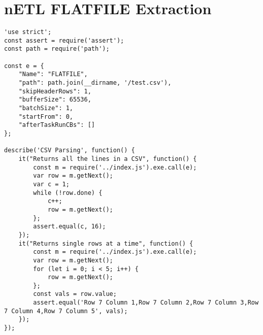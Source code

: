 \section{nETL FLATFILE Extraction}
\label{FLATFILE-tests}
\begin{verbatim}
'use strict';
const assert = require('assert');
const path = require('path');

const e = {
    "Name": "FLATFILE",
    "path": path.join(__dirname, '/test.csv'),
    "skipHeaderRows": 1,
    "bufferSize": 65536,
    "batchSize": 1,
    "startFrom": 0,
    "afterTaskRunCBs": []
};

describe('CSV Parsing', function() {
    it("Returns all the lines in a CSV", function() {
        const m = require('../index.js').exe.call(e);
        var row = m.getNext();
        var c = 1;
        while (!row.done) {
            c++;
            row = m.getNext();
        };
        assert.equal(c, 16);
    });
    it("Returns single rows at a time", function() {
        const m = require('../index.js').exe.call(e);
        var row = m.getNext();
        for (let i = 0; i < 5; i++) {
            row = m.getNext();
        };
        const vals = row.value;
        assert.equal('Row 7 Column 1,Row 7 Column 2,Row 7 Column 3,Row 7 Column 4,Row 7 Column 5', vals);
    });
});
\end{verbatim}